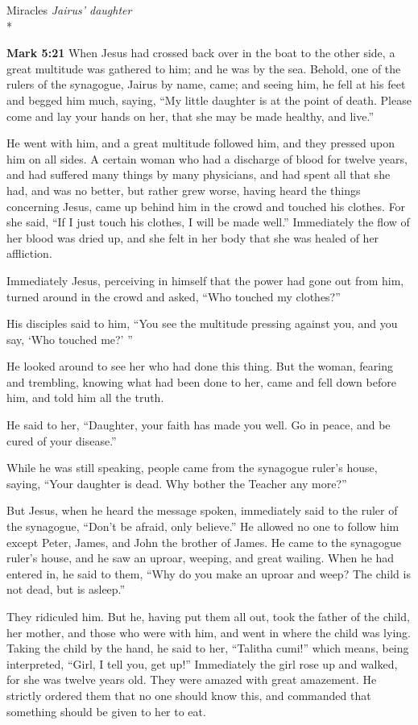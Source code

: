 \documentclass[10pt,twoside]{article} %
\newcommand{\quotesize}{\normalsize{}}
\newenvironment{quotetext}{\begingroup\quotesize}{\endgroup}
\newcommand{\intex}[1]{\index[texts]{#1}}
\newcommand{\bible}[2]{\begin{quotetext}\textbf{#1}\intex{#1} #2\end{quotetext}}
\newcommand{\gospelmark}[2]{\bible{Mark #1}{#2}}
\newcommand{\subhead}[1]{\emph{#1}\\*}
\begin{document}
\begin{section}{Miracles}
\subhead{Jairus' daughter}

\gospelmark{5:21}{
  When Jesus had crossed back over in the boat to the other side, a great multitude was gathered to him; and he was by the sea.   Behold, one of the rulers of the synagogue, Jairus by name, came; and seeing him, he fell at his feet   and begged him much, saying, ``My little daughter is at the point of death. Please come and lay your hands on her, that she may be made healthy, and live.''

  He went with him, and a great multitude followed him, and they pressed upon him on all sides.   A certain woman who had a discharge of blood for twelve years,   and had suffered many things by many physicians, and had spent all that she had, and was no better, but rather grew worse,   having heard the things concerning Jesus, came up behind him in the crowd and touched his clothes.   For she said, ``If I just touch his clothes, I will be made well.''   Immediately the flow of her blood was dried up, and she felt in her body that she was healed of her affliction.

  Immediately Jesus, perceiving in himself that the power had gone out from him, turned around in the crowd and asked, ``Who touched my clothes?''

  His disciples said to him, ``You see the multitude pressing against you, and you say, `Who touched me?' ''

  He looked around to see her who had done this thing.   But the woman, fearing and trembling, knowing what had been done to her, came and fell down before him, and told him all the truth.

  He said to her, ``Daughter, your faith has made you well. Go in peace, and be cured of your disease.''

  While he was still speaking, people came from the synagogue ruler's house, saying, ``Your daughter is dead. Why bother the Teacher any more?''

  But Jesus, when he heard the message spoken, immediately said to the ruler of the synagogue, ``Don't be afraid, only believe.''   He allowed no one to follow him except Peter, James, and John the brother of James.   He came to the synagogue ruler's house, and he saw an uproar, weeping, and great wailing.   When he had entered in, he said to them, ``Why do you make an uproar and weep? The child is not dead, but is asleep.''

  They ridiculed him. But he, having put them all out, took the father of the child, her mother, and those who were with him, and went in where the child was lying.   Taking the child by the hand, he said to her, ``Talitha cumi!'' which means, being interpreted, ``Girl, I tell you, get up!''   Immediately the girl rose up and walked, for she was twelve years old. They were amazed with great amazement.   He strictly ordered them that no one should know this, and commanded that something should be given to her to eat.}


\end{section}
\end{document}
